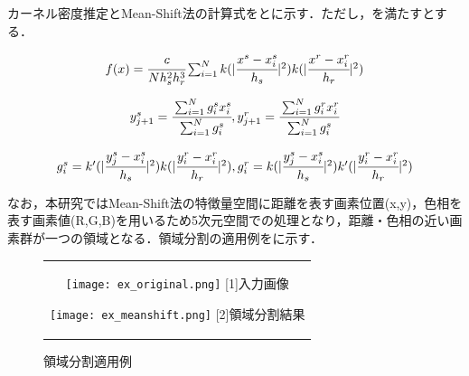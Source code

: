 \documentclass[../Thesis]{subfiles}
\begin{document}
  カーネル密度推定とMean-Shift法の計算式をとに示す．ただし，を満たすとする．
  
  \begin{equation}
    \begin{array}{l}
    f(x) = \cfrac{c}{Nh_s^2h_r^3} \sum_{i=1}^N k (|\cfrac{x^s-x_i^s}{h_s}|^2) k (|\cfrac{x^r-x_i^r}{h_r}|^2)
    \end{array}
  \label{form01}
  \end{equation}
 
  \begin{equation}
    \begin{array}{l}
      y_{j+1}^s = \cfrac{\sum_{i=1}^N g_i^sx_i^s}{\sum_{i=1}^N g_i^s}, y_{j+1}^r = \cfrac{\sum_{i=1}^N g_i^rx_i^r}{\sum_{i=1}^N g_i^s}
    \end{array}
  \label{form02}
  \end{equation}

  \begin{equation}
    \begin{array}{l}
      g_i^s = k' (|\cfrac{y_j^s-x_i^s}{h_s}|^2) k (|\cfrac{y_i^r-x_i^r}{h_r}|^2), g_i^r = k (|\cfrac{y_j^s-x_i^s}{h_s}|^2) k' (|\cfrac{y_i^r-x_i^r}{h_r}|^2)
    \end{array}
  \label{form03}
  \end{equation}
 
  なお，本研究ではMean-Shift法の特徴量空間に距離を表す画素位置(x,y)，色相を表す画素値(R,G,B)を用いるため5次元空間での処理となり，距離・色相の近い画素群が一つの領域となる．領域分割の適用例をに示す．
  
  \begin{figure}[tbp]
  \begin{center}
    \begin{tabular}{c}
      \begin{minipage}{0.5\hsize}
        \begin{center}
          \texttt{[image: ex\_original.png]}
          \hspace{1.7cm} [1]入力画像
        \end{center}
      \end{minipage}
      \begin{minipage}{0.5\hsize}
        \begin{center}
          \texttt{[image: ex\_meanshift.png]}
          \hspace{1.7cm} [2]領域分割結果
        \end{center}
      \end{minipage}
    \end{tabular}
    \caption{領域分割適用例}
    \label{img02}
  \end{center}
  \end{figure}
  
\end{document}
